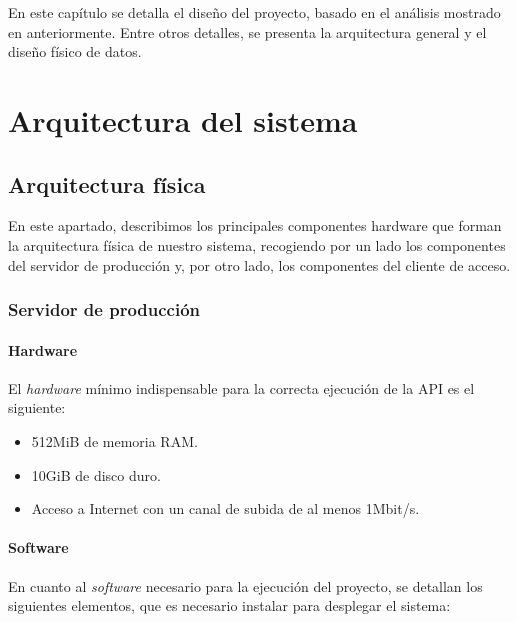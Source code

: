 En este capítulo se detalla el diseño del proyecto, basado en el análisis
mostrado en anteriormente. Entre otros detalles, se presenta la arquitectura
general y el diseño físico de datos.

\section{Arquitectura del sistema}

\subsection{Arquitectura física}
\label{sec:arquitectura-fisica}

En este apartado, describimos los principales componentes hardware que forman
la arquitectura física de nuestro sistema, recogiendo por un lado los componentes
del servidor de producción y, por otro lado, los componentes del cliente de acceso.

\subsubsection{Servidor de producción}
\label{subsec:entorno-produccion}

\paragraph{Hardware}

El \textit{hardware} mínimo indispensable para la correcta ejecución de la API
es el siguiente:

\begin{itemize}
\item 512MiB de memoria RAM.
\item 10GiB de disco duro.
\item Acceso a Internet con un canal de subida de al menos 1Mbit/s.
\end{itemize}


\paragraph{Software}

En cuanto al \textit{software} necesario para la ejecución del proyecto, se
detallan los siguientes elementos, que es necesario instalar para desplegar el
sistema:

